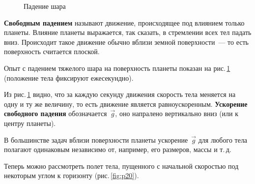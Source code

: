 \documentclass[main.tex]{subfiles}
\begin{document}
{%
\setlength\intextsep{0pt}
\begin{figure}
    \centering
    \caption{Падение шара}
    \label{fig:p19}
\end{figure}

\textbf{Свободным падением} называют движение, происходящее под влиянием только планеты. Влияние планеты выражается, так сказать, в стремлении всех тел падать вниз. Происходит такое движение обычно вблизи земной поверхности~--- то есть поверхность считается плоской.  

Опыт с падением тяжелого шара на поверхность планеты показан на рис.\,\ref{fig:p19} (положение тела фиксируют ежесекундно).
    
Из рис.\,\ref{fig:p19} видно, что за каждую секунду движения скорость тела меняется на одну и ту же величину, то есть движение является равноускоренным. \textbf{Ускорение свободного падения} обозначается~$\vec g$, оно напралено вертикально вниз (или к центру планеты).

В большинстве задач вблизи поверхности планеты ускорение~$\vec g$ для любого тела полагают одинаковым независимо от, например, его размеров, массы и т.\,д.

Теперь можно рассмотреть полет тела, пущенного с начальной скоростью под некоторым углом к горизонту (рис.\,\ref{fig:p20}).

}
\end{document}
